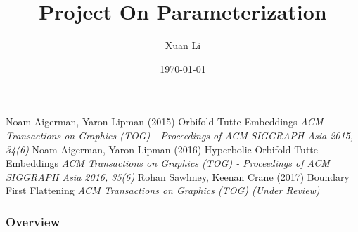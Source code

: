 \documentclass{beamer}
\title[Short title]{Project On Parameterization} %
\author{Xuan Li} %
\institute[CS@SBU] %
{
Stony Brook University \\ %
\medskip
\textit{xuanli2@cs.stonybrook.edu} %
}
\date{\today} %
\begin{document}
\begin{frame}
\titlepage %
\end{frame}
\begin{frame}
\footnotesize{
\begin{thebibliography}{99} %
 Noam Aigerman, Yaron Lipman  (2015)
\newblock Orbifold Tutte Embeddings
\newblock \emph{ACM Transactions on Graphics (TOG) - Proceedings of ACM SIGGRAPH Asia 2015, 34(6)}
Noam Aigerman, Yaron Lipman (2016)
\newblock Hyperbolic Orbifold Tutte Embeddings
\newblock \emph{ACM Transactions on Graphics (TOG) - Proceedings of ACM SIGGRAPH Asia 2016, 35(6)}
Rohan Sawhney, Keenan Crane (2017)
\newblock Boundary First Flattening
\newblock \emph{ACM Transactions on Graphics (TOG) (Under Review)}
\end{thebibliography}
}
\end{frame}

\begin{frame}
\frametitle{Overview} %
\tableofcontents %
\end{frame}


\end{document}
